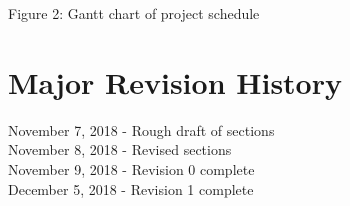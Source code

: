\documentclass[12,english]{article}
\begin{document}
	Figure 2: Gantt chart of project schedule
	
\section{Major Revision History}
November 7, 2018 - Rough draft of sections\\
November 8, 2018 - Revised sections\\ 
November 9, 2018 - Revision 0 complete\\
December 5, 2018 - Revision 1 complete



\end{document}

